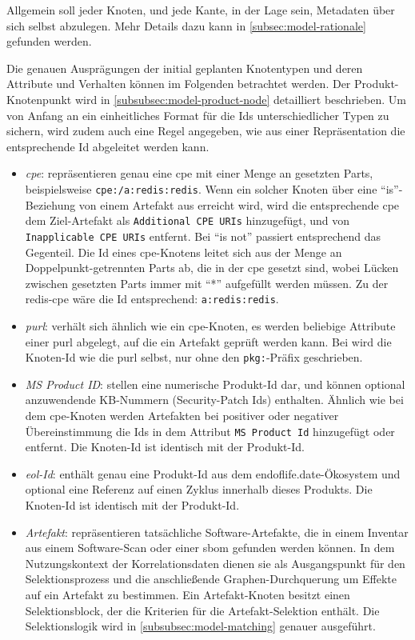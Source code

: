 Allgemein soll jeder Knoten, und jede Kante, in der Lage sein, Metadaten über sich selbst abzulegen.
Mehr Details dazu kann in \autoref{subsec:model-rationale} gefunden werden.

Die genauen Ausprägungen der initial geplanten Knotentypen und deren Attribute und Verhalten können im Folgenden betrachtet werden.
Der Produkt-Knotenpunkt wird in \autoref{subsubsec:model-product-node} detailliert beschrieben.
Um von Anfang an ein einheitliches Format für die Ids unterschiedlicher Typen zu sichern, wird zudem auch eine Regel angegeben, wie aus einer Repräsentation die entsprechende Id abgeleitet werden kann.

\begin{itemize}
    \itemsep0em
    \item \textit{\acrshort{cpe}}: repräsentieren genau eine \acrshort{cpe} mit einer Menge an gesetzten Parts, beispielsweise \texttt{cpe:/a:redis:redis}.
    Wenn ein solcher Knoten über eine \enquote{is}-Beziehung von einem Artefakt aus erreicht wird, wird die entsprechende \acrshort{cpe} dem Ziel-Artefakt als \texttt{Additional CPE URIs} hinzugefügt, und von \texttt{Inapplicable CPE URIs} entfernt.
    Bei \enquote{is not} passiert entsprechend das Gegenteil.
    Die Id eines \acrshort{cpe}-Knotens leitet sich aus der Menge an Doppelpunkt-getrennten Parts ab, die in der \acrshort{cpe} gesetzt sind, wobei Lücken zwischen gesetzten Parts immer mit \enquote{*} aufgefüllt werden müssen.
    Zu der redis-\acrshort{cpe} wäre die Id entsprechend: \texttt{a:redis:redis}.
    \item \textit{\acrshort{purl}}: verhält sich ähnlich wie ein \acrshort{cpe}-Knoten, es werden beliebige Attribute einer \acrshort{purl} abgelegt, auf die ein Artefakt geprüft werden kann.
    Bei  wird die Knoten-Id wie die \acrshort{purl} selbst, nur ohne den \texttt{pkg:}-Präfix geschrieben.
    \item \textit{MS Product ID}: stellen eine numerische Produkt-Id dar, und können optional anzuwendende KB-Nummern (Security-Patch Ids) enthalten.
    Ähnlich wie bei dem \acrshort{cpe}-Knoten werden Artefakten bei positiver oder negativer Übereinstimmung die Ids in dem Attribut \texttt{MS Product Id} hinzugefügt oder entfernt.
    Die Knoten-Id ist identisch mit der Produkt-Id.
    \item \textit{\acrshort{eol}-Id}: enthält genau eine Produkt-Id aus dem endoflife.date-Ökosystem und optional eine Referenz auf einen Zyklus innerhalb dieses Produkts.
    Die Knoten-Id ist identisch mit der Produkt-Id.
    \item \textit{Artefakt}: repräsentieren tatsächliche Software-Artefakte, die in einem Inventar aus einem Software-Scan oder einer \acrshort{sbom} gefunden werden können.
    In dem Nutzungskontext der Korrelationsdaten dienen sie als Ausgangspunkt für den Selektionsprozess und die anschließende Graphen-Durchquerung um Effekte auf ein Artefakt zu bestimmen.
    Ein Artefakt-Knoten besitzt einen Selektionsblock, der die Kriterien für die Artefakt-Selektion enthält.
    Die Selektionslogik wird in \autoref{subsubsec:model-matching} genauer ausgeführt.
\end{itemize}

